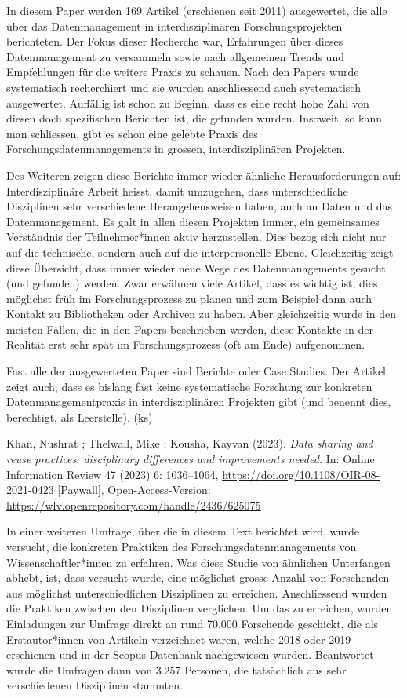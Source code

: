 \documentclass[a4paper,
fontsize=11pt,
oneside,
numbers=noperiodatend,
parskip=half-,
bibliography=totoc,
final
]{scrartcl}
\begin{document}
In diesem Paper werden 169 Artikel (erschienen seit 2011) ausgewertet,
die alle über das Datenmanagement in interdisziplinären
Forschungsprojekten berichteten. Der Fokus dieser Recherche war,
Erfahrungen über dieses Datenmanagement zu versammeln sowie nach
allgemeinen Trends und Empfehlungen für die weitere Praxis zu schauen.
Nach den Papers wurde systematisch recherchiert und sie wurden
anschliessend auch systematisch ausgewertet. Auffällig ist schon zu
Beginn, dass es eine recht hohe Zahl von diesen doch spezifischen
Berichten ist, die gefunden wurden. Insoweit, so kann man schliessen,
gibt es schon eine gelebte Praxis des Forschungsdatenmanagements in
grossen, interdisziplinären Projekten.

Des Weiteren zeigen diese Berichte immer wieder ähnliche
Herausforderungen auf: Interdisziplinäre Arbeit heisst, damit umzugehen,
dass unterschiedliche Disziplinen sehr verschiedene Herangehensweisen
haben, auch an Daten und das Datenmanagement. Es galt in allen diesen
Projekten immer, ein gemeinsames Verständnis der Teilnehmer*innen aktiv
herzustellen. Dies bezog sich nicht nur auf die technische, sondern auch
auf die interpersonelle Ebene. Gleichzeitig zeigt diese Übersicht, dass
immer wieder neue Wege des Datenmanagements gesucht (und gefunden)
werden. Zwar erwähnen viele Artikel, dass es wichtig ist, dies möglichst
früh im Forschungsprozess zu planen und zum Beispiel dann auch Kontakt
zu Bibliotheken oder Archiven zu haben. Aber gleichzeitig wurde in den
meisten Fällen, die in den Papers beschrieben werden, diese Kontakte in
der Realität erst sehr spät im Forschungsprozess (oft am Ende)
aufgenommen.

Fast alle der ausgewerteten Paper sind Berichte oder Case Studies. Der
Artikel zeigt auch, dass es bislang fast keine systematische Forschung
zur konkreten Datenmanagementpraxis in interdisziplinären Projekten gibt
(und benennt dies, berechtigt, als Leerstelle). (ks)

Khan, Nushrat ; Thelwall, Mike ; Kousha, Kayvan (2023). \emph{Data
sharing and reuse practices: disciplinary differences and improvements
needed.} In: Online Information Review 47 (2023) 6: 1036--1064,
\url{https://doi.org/10.1108/OIR-08-2021-0423} {[}Paywall{]},
Open-Access-Version:
\url{https://wlv.openrepository.com/handle/2436/625075}

In einer weiteren Umfrage, über die in diesem Text berichtet wird, wurde
versucht, die konkreten Praktiken des Forschungsdatenmanagements von
Wissenschaftler*innen zu erfahren. Was diese Studie von ähnlichen
Unterfangen abhebt, ist, dass versucht wurde, eine möglichst grosse
Anzahl von Forschenden aus möglichst unterschiedlichen Disziplinen zu
erreichen. Anschliessend wurden die Praktiken zwischen den Disziplinen
verglichen. Um das zu erreichen, wurden Einladungen zur Umfrage direkt
an rund 70.000 Forschende geschickt, die als Erstautor*innen von
Artikeln verzeichnet waren, welche 2018 oder 2019 erschienen und in der
Scopus-Datenbank nachgewiesen wurden. Beantwortet wurde die Umfragen
dann von 3.257 Personen, die tatsächlich aus sehr verschiedenen
Disziplinen stammten.
\end{document}
